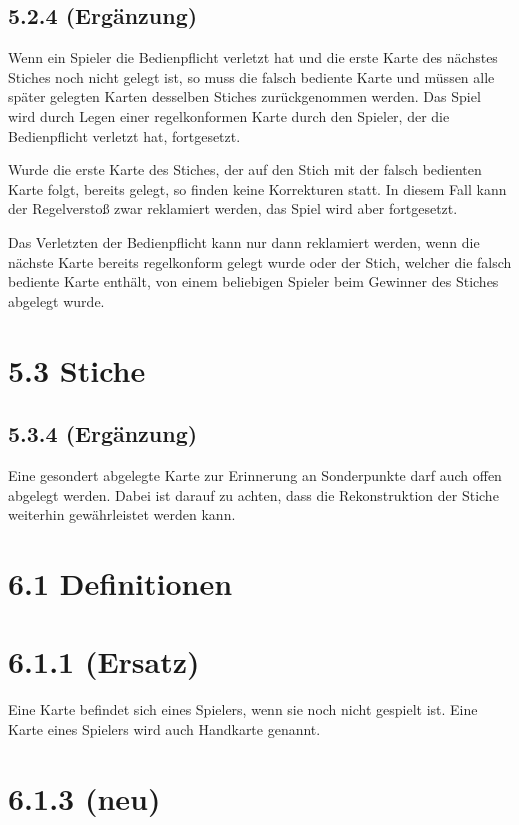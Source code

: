 \subsection*{5.2.4 (Ergänzung)}

Wenn ein Spieler die Bedienpflicht verletzt hat und die erste Karte des nächstes
Stiches noch nicht gelegt ist, so muss die falsch bediente Karte und müssen alle
später gelegten Karten desselben Stiches zurückgenommen werden. Das Spiel wird
durch Legen einer regelkonformen Karte durch den Spieler, der die Bedienpflicht
verletzt hat, fortgesetzt.

Wurde die erste Karte des Stiches, der auf den Stich mit der falsch bedienten
Karte folgt, bereits gelegt, so finden keine Korrekturen statt. In diesem Fall
kann der Regelverstoß zwar reklamiert werden, das Spiel wird aber fortgesetzt.

Das Verletzten der Bedienpflicht kann nur dann reklamiert werden, wenn die
nächste Karte bereits regelkonform gelegt wurde oder der Stich, welcher die
falsch bediente Karte enthält, von einem beliebigen Spieler beim Gewinner des
Stiches abgelegt wurde.

\section*{5.3 Stiche}

\subsection*{5.3.4 (Ergänzung)}

Eine gesondert abgelegte Karte zur Erinnerung an Sonderpunkte darf auch
offen abgelegt werden. Dabei ist darauf zu achten, dass die
Rekonstruktion der Stiche weiterhin gewährleistet werden kann.

\section*{6.1 Definitionen}

\section*{6.1.1 (Ersatz)}

Eine Karte befindet sich  eines Spielers, wenn sie noch nicht
gespielt ist. Eine Karte  eines Spielers wird auch Handkarte
genannt.

\section*{6.1.3 (neu)}

